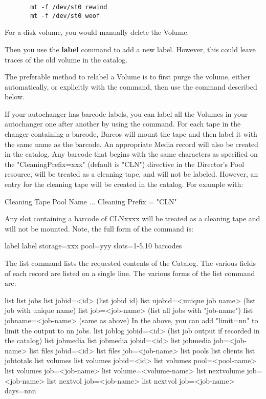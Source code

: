 \begin{description}
\footnotesize
\begin{verbatim}
       mt -f /dev/st0 rewind
       mt -f /dev/st0 weof
\end{verbatim}
\normalsize

For a disk volume, you would manually delete the Volume.

Then you use the {\bf label} command to add a new label.  However, this could
leave traces of the old volume in the  catalog.

The preferable method to relabel a Volume is to first purge the volume,
either automatically, or explicitly with the   command,
then use the  command described  below.

If your autochanger has barcode labels, you can label all the Volumes in
your autochanger one after another by using the 
command.  For each tape in the changer containing a barcode, Bareos will
mount the tape and then label it with the same name as the barcode.  An
appropriate Media record will also be created in the catalog.  Any barcode
that begins with the same characters as specified on the
"CleaningPrefix=xxx" (default is "CLN") directive in the Director's Pool resource, will be
treated as a cleaning tape, and will not be labeled.  However, an entry for
the cleaning tape will be created in the catalog.  For example with:

\begin{bconfig}{Cleaning Tape}
Pool {
    Name ...
    Cleaning Prefix = "CLN"
}
\end{bconfig}

Any slot containing a barcode of CLNxxxx will be treated as a cleaning tape
and will not be mounted.  Note, the full form of the command is:

\begin{bconsole}{label}
label storage=xxx pool=yyy slots=1-5,10 barcodes
\end{bconsole}

\item [list]
   The list command lists the requested contents of the Catalog.  The
   various fields of each record are listed on a single line.  The various
   forms of the list command are:

\begin{bconsole}{list}
list jobs
list jobid=<id>           (list jobid id)
list ujobid=<unique job name> (list job with unique name)
list job=<job-name>   (list all jobs with "job-name")
list jobname=<job-name>  (same as above)
    In the above, you can add "limit=nn" to limit the output to nn jobs.
list joblog jobid=<id> (list job output if recorded in the catalog)
list jobmedia
list jobmedia jobid=<id>
list jobmedia job=<job-name>
list files jobid=<id>
list files job=<job-name>
list pools
list clients
list jobtotals
list volumes
list volumes jobid=<id>
list volumes pool=<pool-name>
list volumes job=<job-name>
list volume=<volume-name>
list nextvolume job=<job-name>
list nextvol job=<job-name>
list nextvol job=<job-name> days=nnn
\end{bconsole}


\end{description}
